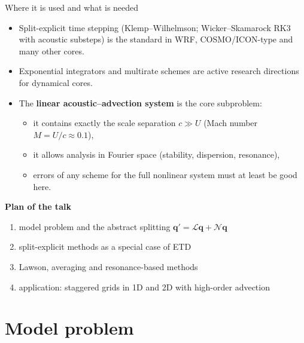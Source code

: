 \documentclass[aspectratio=169,10pt]{beamer}
\newcommand{\bq}{\mathbf{q}}
\newcommand{\LL}{\mathcal{L}}   %
\newcommand{\NN}{\mathcal{N}}   %
\begin{document}
\begin{frame}{Where it is used and what is needed}
  \begin{itemize}
    \item Split-explicit time stepping (Klemp--Wilhelmson; Wicker--Skamarock RK3 with acoustic substeps) is the standard in WRF, COSMO/ICON-type and many other cores.
    \item Exponential integrators and multirate schemes are active research directions for dynamical cores.
    \item The \textbf{linear acoustic--advection system} is the core subproblem:
    \begin{itemize}
      \item it contains exactly the scale separation $c \gg U$ (Mach number $M=U/c\approx 0.1$),
      \item it allows analysis in Fourier space (stability, dispersion, resonance),
      \item errors of any scheme for the full nonlinear system must at least be good here.
    \end{itemize}
  \end{itemize}
  \vspace{0.5em}
  \textbf{Plan of the talk}
  \begin{enumerate}
    \item model problem and the abstract splitting $\bq'=\LL\bq+\NN\bq$
    \item split-explicit methods as a special case of ETD
    \item Lawson, averaging and resonance-based methods
    \item application: staggered grids in 1D and 2D with high-order advection
  \end{enumerate}
\end{frame}

\section{Model problem}
\end{document}
